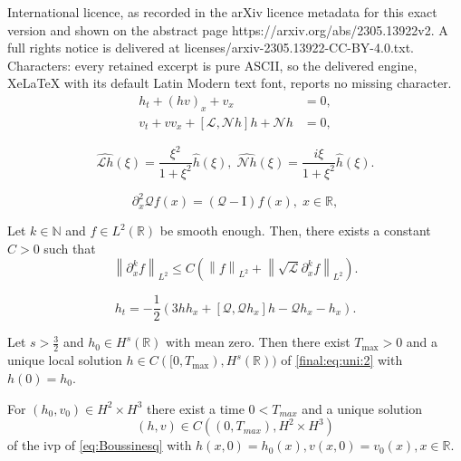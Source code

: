 \documentclass[10pt,a4paper]{amsart}
\newcommand{\RR}{\mathbb R}
\newcommand{\norm}[1]{\left\| #1 \right\|}
\newcommand{\pa}{\partial}
\begin{document}
International licence, as recorded in the arXiv licence metadata for this exact version and shown on the abstract page https://arxiv.org/abs/2305.13922v2. A full rights notice is delivered at licenses/arxiv-2305.13922-CC-BY-4.0.txt. Characters: every retained excerpt is pure ASCII, so the delivered engine, XeLaTeX with its default Latin Modern text font, reports no missing character.
\begin{subequations}\label{eq:Boussinesq}
\begin{align}
h_t+(hv)_x+v_x&=0,\\
v_t+vv_x+\left[\mathscr{L},\mathscr{N}h\right]h+\mathscr{N}h&=0,
\end{align}
\end{subequations}

\begin{equation}\label{adg4}
\widehat{\mathscr{L}h}(\xi)=\frac{\xi^2}{1+\xi^2}\hat{h}(\xi),
\; \widehat{\mathscr{N}h}(\xi)=\frac{i\xi}{1+\xi^2}\hat{h}(\xi).
\end{equation}

\begin{equation}\label{comp:helmholtz}
\pa_{x}^{2}\mathscr{Q}f(x)=\left( \mathscr{Q}-\text{I}\right)f(x),\; x\in\mathbb{R},
\end{equation}

\begin{lemma}\label{lema:LtoL2}
Let  $k\in \mathbb{N}$ and $f\in L^{2}(\RR)$ be smooth enough. Then, there exists a constant $C>0$ such that 
\begin{equation}\label{estimate:lema:LtoL2}
\norm{\pa_{x}^{k}f}_{L^{2}} \leq C\left(\norm{f}_{L^{2}}+\norm{\sqrt{\mathscr{L}}\pa_{x}^{k}f}_{L^{2}}\right).
\end{equation}
\end{lemma}

\begin{equation}\label{final:eq:uni:2}
h_{t}=-\frac{1}{2}\left(3 hh_{x}+[\mathscr{Q},\mathscr{Q}h_{x}]h - \mathscr{Q}h_{x}-h_{x} \right). 
\end{equation}

\begin{theorem}\label{theorem1}
Let $s>\frac{3}{2}$  and $h_0\in H^{s}(\RR)$ {with mean zero}. Then there exist $T_{\max}>0$ and a unique local solution $h\in C([0,T_{\max}),H^{s}(\RR))$ of \eqref{final:eq:uni:2} with $h(0)=h_{0}$.
\end{theorem}

\begin{theorem}\label{theoremBouss}
For $(h_0,v_0)\in H^2\times H^3$  there exist a time $0<T_{max}$ and a unique solution 
\[ (h,v)\in C((0,T_{max}), H^2\times H^3)\]
of the ivp of \eqref{eq:Boussinesq} with $h(x,0)=h_{0}(x), v(x,0)=v_{0}(x), x\in\mathbb{R}$.
\end{theorem}
\end{document}
